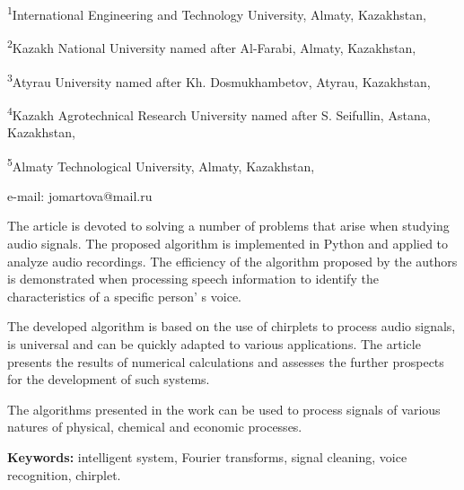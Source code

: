 \begin{affiliation}
\textsuperscript{1}International Engineering and Technology University, Almaty, Kazakhstan,

\textsuperscript{2}Kazakh National University named after Al-Farabi, Almaty, Kazakhstan,

\textsuperscript{3}Atyrau University named after Kh. Dosmukhambetov, Atyrau, Kazakhstan,

\textsuperscript{4}Kazakh Agrotechnical Research University named after S. Seifullin, Astana, Kazakhstan,

\textsuperscript{5}Almaty Technological University, Almaty, Kazakhstan,

e-mail: jomartova@mail.ru
\end{affiliation}

The article is devoted to solving a number of problems that arise when
studying audio signals. The proposed algorithm is implemented in Python
and applied to analyze audio recordings. The efficiency of the algorithm
proposed by the authors is demonstrated when processing speech
information to identify the characteristics of a specific
person' s voice.

The developed algorithm is based on the use of chirplets to process
audio signals, is universal and can be quickly adapted to various
applications. The article presents the results of numerical calculations
and assesses the further prospects for the development of such systems.

The algorithms presented in the work can be used to process signals of
various natures of physical, chemical and economic processes.

{\bfseries Keywords:} intelligent system, Fourier transforms, signal
cleaning, voice recognition, chirplet.

